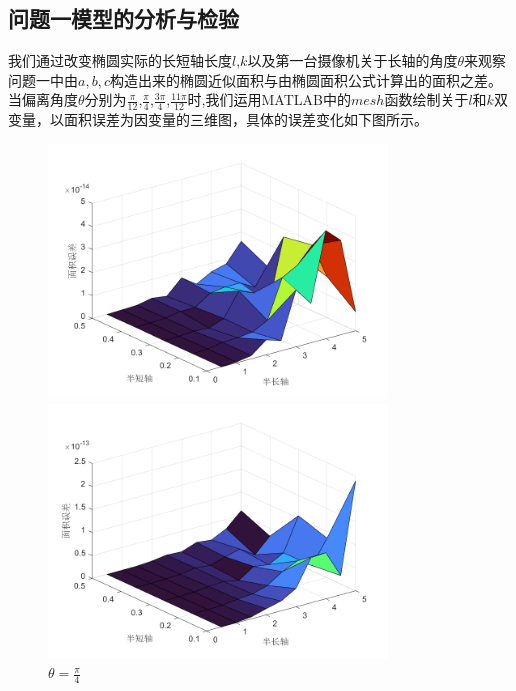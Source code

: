 \documentclass[a4paper,10.5pt]{ctexart}
\begin{document}
\subsection{问题一模型的分析与检验}
\par 我们通过改变椭圆实际的长短轴长度$l$,$k$以及第一台摄像机关于长轴的角度$\theta$来观察问题一中由$a,b,c$构造出来的椭圆近似面积与由椭圆面积公式计算出的面积之差。当偏离角度$\theta$分别为$\frac{\pi}{12}$,$\frac{\pi}{4}$,$\frac{3\pi}{4}$,$\frac{11\pi}{12}$时,我们运用MATLAB中的$mesh$函数绘制关于$l$和$k$双变量，以面积误差为因变量的三维图，具体的误差变化如下图所示。
\begin{figure}[h]
\centering
\begin{minipage}[t]{0.48\textwidth}
\centering
\includegraphics[width=9cm]{误差3.png}
\caption{$\theta=\frac{\pi}{12}$}
\end{minipage}
\begin{minipage}[t]{0.48\textwidth}
\centering
\includegraphics[width=9cm]{误差1.png}
\caption{$\theta=\frac{\pi}{4}$}
\end{minipage}
\end{figure}
\end{document}
